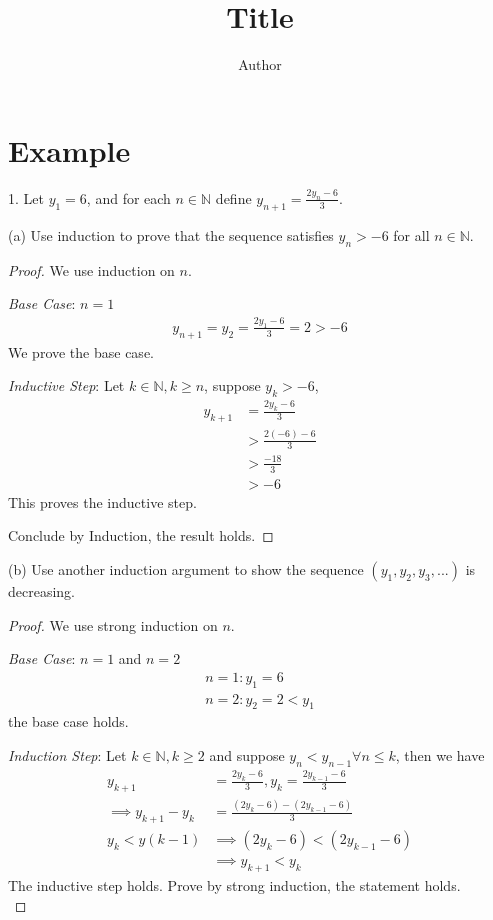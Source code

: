 \documentclass[12pt]{article}
\title{Title}
\author{Author}
\date{}
\newcommand{\N}{\mathbb{N}}
\newcommand{\1}{\mathds{1}}
\begin{document}
\section*{Example}

1. Let $y_1=6$, and for each $n\in \N$ define $y_{n+1}=\frac{2y_n-6}{3}$.

(a) Use induction to prove that the sequence satisfies $y_n>-6$ for all $n\in \N$.

\begin{proof}
    We use induction on $n$.

    \textit{Base Case}: $n=1$
    \begin{align*}
        y_{n+1} = y_2 = \frac{2y_1-6}{3} = 2 > -6
    \end{align*}
    \indent We prove the base case.

    \textit{Inductive Step}: Let $k \in \N, k \geq n$, suppose $y_k > -6$,
    \begin{align*}
        y_{k+1} & = \frac{2y_{k}-6}{3} \\
        & > \frac{2(-6) - 6}{3} \\
        & > \frac{-18}{3} \\
        & > -6
    \end{align*}
    \indent This proves the inductive step.

    Conclude by Induction, the result holds.
\end{proof}

(b) Use another induction argument to show the sequence $(y_1,y_2,y_3,...)$ is decreasing.

\begin{proof}
    We use strong induction on $n$.

    
    \textit{Base Case}: $n=1$ and $n=2$
    \begin{align*}
        n=1: y_1 = 6 \\
        n=2: y_2 = 2 < y_1
    \end{align*}
    \indent the base case holds.

    \textit{Induction Step}: Let $k \in \N, k \geq 2$ and suppose $y_n < y_{n-1} \forall n \leq k$, then we have
    \begin{align*}
        y_{k+1} & = \frac{2y_k-6}{3}, y_k = \frac{2y_{k-1}-6}{3} \\
        \implies y_{k+1} - y_k & = \frac{(2y_k-6) - (2y_{k-1}-6)}{3} \\
        y_{k} < y(k-1) & \implies (2y_k-6) < (2y_{k-1}-6) \\
        & \implies y_{k+1} < y_k
    \end{align*}
    \indent The inductive step holds. Prove by strong induction, the statement holds. \\
\end{proof}
\end{document}
